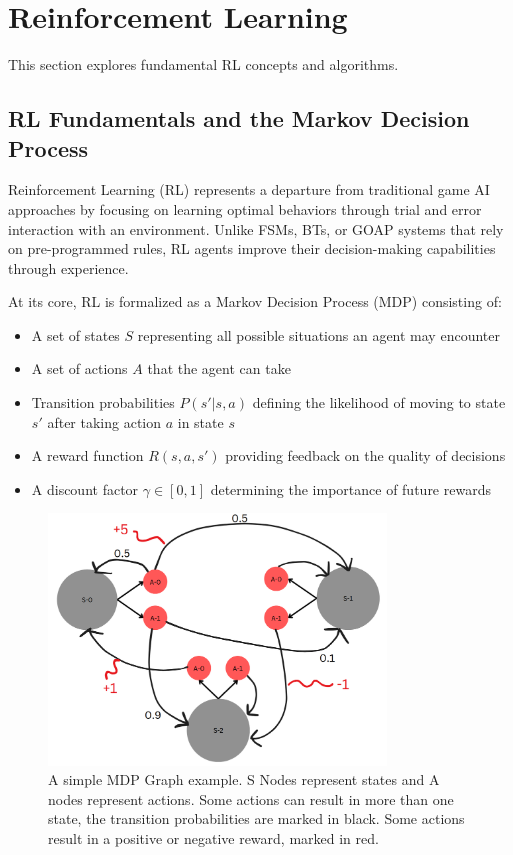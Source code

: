 \section{Reinforcement Learning}

This section explores fundamental RL concepts and algorithms.

\subsection{RL Fundamentals and the Markov Decision Process}

Reinforcement Learning (RL) represents a departure from traditional game AI approaches by focusing on learning optimal behaviors through trial and error interaction with an environment. 
Unlike FSMs, BTs, or GOAP systems that rely on pre-programmed rules, RL agents improve their decision-making capabilities through experience.

At its core, RL is formalized as a Markov Decision Process (MDP) consisting of:
\begin{itemize}
    \item A set of states $S$ representing all possible situations an agent may encounter
    \item A set of actions $A$ that the agent can take
    \item Transition probabilities $P(s'|s,a)$ defining the likelihood of moving to state $s'$ after taking action $a$ in state $s$
    \item A reward function $R(s,a,s')$ providing feedback on the quality of decisions
    \item A discount factor $\gamma \in [0,1]$ determining the importance of future rewards
\end{itemize}

\begin{figure}[h]
    \centering
    \includegraphics[width=0.8\textwidth]{figures/mdp_framework.png}
    \caption{A simple MDP Graph example. S Nodes represent states and A nodes represent actions. 
    Some actions can result in more than one state, the transition probabilities are marked in black. 
    Some actions result in a positive or negative reward, marked in red.}
    \label{fig:mdp-framework}
\end{figure}

